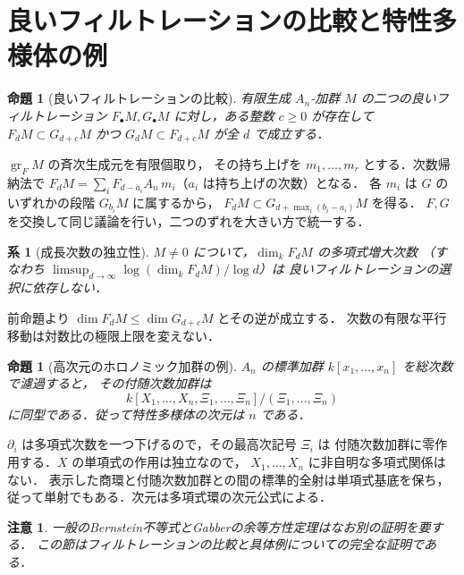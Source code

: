 \documentclass[a5paper,10pt,onecolumn]{jsarticle}
\makeatletter
\theoremstyle{mathnotetheorem}
\newtheorem{proposition}[theorem]{命題}
\newtheorem{corollary}[theorem]{系}
\newtheorem{remark}[theorem]{注意}
\renewcommand{\proofname}{証明}
\renewenvironment{proof}[1][\proofname]{%
  \par\pushQED{\qed}\normalfont\topsep4\p@\@plus2\p@\relax
  \trivlist\item[\hskip\labelsep\bfseries #1]\ignorespaces
}{\popQED\endtrivlist\@endpefalse}
\makeatother
\begin{document}
\section{良いフィルトレーションの比較と特性多様体の例}
\begin{proposition}[良いフィルトレーションの比較]
有限生成 $A_n$-加群 $M$ の二つの良いフィルトレーション
$F_\bullet M,G_\bullet M$ に対し，ある整数 $c\ge0$ が存在して
$F_dM\subset G_{d+c}M$ かつ $G_dM\subset F_{d+c}M$ が全 $d$ で成立する．
\end{proposition}
\begin{proof}
$\operatorname{gr}_F M$ の斉次生成元を有限個取り，
その持ち上げを $m_1,\ldots,m_r$ とする．次数帰納法で
$F_dM=\sum_i F_{d-a_i}A_n\,m_i$（$a_i$ は持ち上げの次数）となる．
各 $m_i$ は $G$ のいずれかの段階 $G_{b_i}M$ に属するから，
$F_dM\subset G_{d+\max_i(b_i-a_i)}M$ を得る．
$F,G$ を交換して同じ議論を行い，二つのずれを大きい方で統一する．
\end{proof}
\begin{corollary}[成長次数の独立性]
$M\ne0$ について，$\dim_kF_dM$ の多項式増大次数
（すなわち $\limsup_{d\to\infty}\log(\dim_k F_dM)/\log d$）は
良いフィルトレーションの選択に依存しない．
\end{corollary}
\begin{proof}
前命題より $\dim F_dM\le\dim G_{d+c}M$ とその逆が成立する．
次数の有限な平行移動は対数比の極限上限を変えない．
\end{proof}
\begin{proposition}[高次元のホロノミック加群の例]
$A_n$ の標準加群 $k[x_1,\ldots,x_n]$ を総次数で濾過すると，
その付随次数加群は
\[
 k[X_1,\ldots,X_n,\Xi_1,\ldots,\Xi_n]
 /(\Xi_1,\ldots,\Xi_n)
\]
に同型である．従って特性多様体の次元は $n$ である．
\end{proposition}
\begin{proof}
$\partial_i$ は多項式次数を一つ下げるので，その最高次記号 $\Xi_i$ は
付随次数加群に零作用する．$X$ の単項式の作用は独立なので，
$X_1,\ldots,X_n$ に非自明な多項式関係はない．
表示した商環と付随次数加群との間の標準的全射は単項式基底を保ち，
従って単射でもある．次元は多項式環の次元公式による．
\end{proof}
\begin{remark}
一般のBernstein不等式とGabberの余等方性定理はなお別の証明を要する．
この節はフィルトレーションの比較と具体例についての完全な証明である．
\end{remark}
\end{document}
